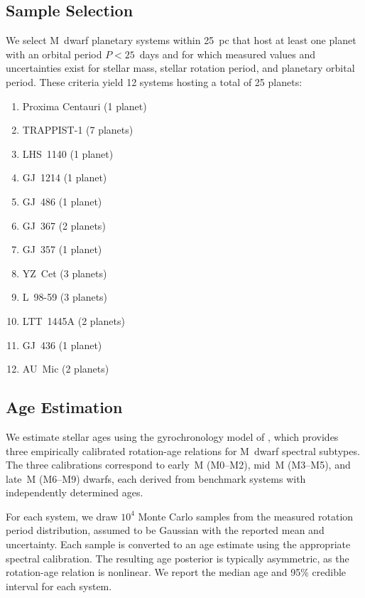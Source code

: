 \documentclass[twocolumn]{aastex631}
\begin{document}
\subsection{Sample Selection} \label{sec:sample}

We select M~dwarf planetary systems within 25~pc that host at least one planet
with an orbital period $P < 25$~days and for which measured values and
uncertainties exist for stellar mass, stellar rotation period, and planetary
orbital period. These criteria yield 12 systems hosting a total of 25
planets:

\begin{enumerate}
  \item Proxima Centauri (1 planet)
  \item TRAPPIST-1 (7 planets)
  \item LHS~1140 (1 planet)
  \item GJ~1214 (1 planet)
  \item GJ~486 (1 planet)
  \item GJ~367 (2 planets)
  \item GJ~357 (1 planet)
  \item YZ~Cet (3 planets)
  \item L~98-59 (3 planets)
  \item LTT~1445A (2 planets)
  \item GJ~436 (1 planet)
  \item AU~Mic (2 planets)
\end{enumerate}

\subsection{Age Estimation} \label{sec:ages}

We estimate stellar ages using the gyrochronology model of
\citet{EngleGuinan2023}, which provides three empirically calibrated
rotation-age relations for M~dwarf spectral subtypes. The three calibrations
correspond to early~M (M0--M2), mid~M (M3--M5), and late~M (M6--M9) dwarfs,
each derived from benchmark systems with independently determined ages.

For each system, we draw $10^4$ Monte Carlo samples from the measured rotation
period distribution, assumed to be Gaussian with the reported mean and
uncertainty. Each sample is converted to an age estimate using the appropriate
spectral calibration. The resulting age posterior is typically asymmetric, as
the rotation-age relation is nonlinear. We report the median age and 95\%
credible interval for each system.
\end{document}
